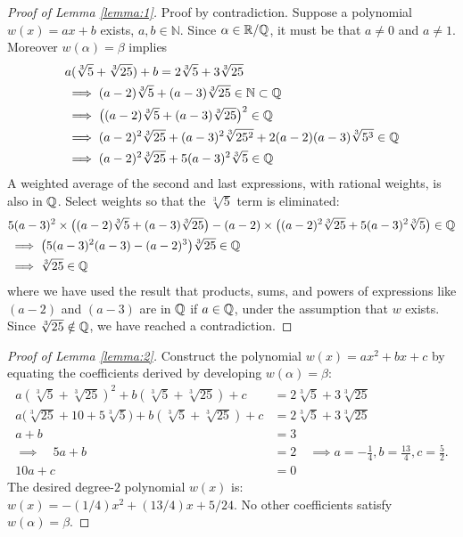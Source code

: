 \begin{proof}[Proof of Lemma \ref{lemma:1}]
Proof by contradiction. Suppose a polynomial $w(x)=ax+b$ exists, $a,b\in\mathbb{N}$. Since $\alpha\in\mathbb{R}/\mathbb{Q}$, it must be that $a\ne0$ and $a\ne1$. Moreover $w(\alpha)=\beta$ implies
\begin{align*}
&
a (\sqrt[3]{5}+\sqrt[3]{25}) + b
= 2\sqrt[3]{5}+3\sqrt[3]{25}
\\
& \implies
(a-2)\sqrt[3]{5} + (a-3)\sqrt[3]{25} 
\in \mathbb{N} \subset \mathbb{Q}
\\
& \implies
\bigl((a-2)\sqrt[3]{5} + (a-3)\sqrt[3]{25}\bigr)^{2}
\in \mathbb{Q}
\\
& \implies
(a-2)^{2}\sqrt[3]{25} + (a-3)^{2}\sqrt[3]{25^{2}} + 2(a-2)(a-3)\sqrt[3]{5^{3}} 
\in \mathbb{Q}
\\
& \implies
(a-2)^{2}\sqrt[3]{25} + 5(a-3)^{2}\sqrt[3]{5} 
\in \mathbb{Q}
\end{align*}
A weighted average of the second and last expressions, with rational weights, is also in $\mathbb{Q}$. Select weights so that the $\sqrt[3]{5}$ term is eliminated:
\begin{align*}
&
5(a-3)^{2} \times 
\bigl((a-2)\sqrt[3]{5} + (a-3)\sqrt[3]{25}\bigr)
-
(a-2) \times
\bigl((a-2)^{2}\sqrt[3]{25} + 5(a-3)^{2}\sqrt[3]{5}\bigr)
\in \mathbb{Q}
\\
& \implies
\bigl(5(a-3)^{2}(a-3) - (a-2)^{3}\bigr)\sqrt[3]{25}
\in \mathbb{Q}
\\
& \implies
\sqrt[3]{25}
\in \mathbb{Q}
\end{align*}
where we have used the result that products, sums, and powers of expressions like $(a-2)$ and $(a-3)$ are in $\mathbb{Q}$ if $a\in\mathbb{Q}$, under the assumption that $w$ exists. Since $\sqrt[3]{25}\notin\mathbb{Q}$, we have reached a contradiction.
\end{proof}

\begin{proof}[Proof of Lemma \ref{lemma:2}]
Construct the polynomial $w(x)=ax^{2}+bx+c$ by equating the coefficients derived by developing $w(\alpha)=\beta$:
\begin{align*}
a (\sqrt[3]{5}+\sqrt[3]{25})^{2} + b (\sqrt[3]{5}+\sqrt[3]{25}) + c
& = 2\sqrt[3]{5} + 3\sqrt[3]{25}
\\[1ex]
a \bigl(\sqrt[3]{25} + 10 + 5\sqrt[3]{5}\bigr)
+ b (\sqrt[3]{5}+\sqrt[3]{25}) + c
& = 2\sqrt[3]{5} + 3\sqrt[3]{25}
\\
a + b
& = 3
\\ 
\implies \quad
5a + b
& = 2
\quad \implies 
a = -\frac{1}{4}, 
b = \frac{13}{4}, 
c = \frac{5}{2}.
\\ 
10a + c
& = 0
\end{align*}
The desired degree-$2$ polynomial $w(x)$ is: $w(x)=-(1/4)x^{2}+(13/4)x+5/24$. No other coefficients satisfy $w(\alpha)=\beta$.
\end{proof}

